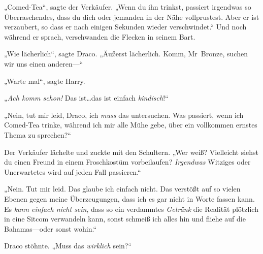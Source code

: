 „Comed-Tea“, sagte der Verkäufer. „Wenn du ihn trinkst, passiert irgendwas so Überraschendes, dass du dich oder jemanden in der Nähe vollprustest. Aber er ist verzaubert, so dass er nach einigen Sekunden wieder verschwindet.“ Und noch während er sprach, verschwanden die Flecken in seinem Bart.

„Wie lächerlich“, sagte Draco. „Äußerst lächerlich. Komm, Mr~Bronze, suchen wir uns einen anderen—“

„Warte mal“, sagte Harry.

„\emph{Ach komm schon!} Das ist…das ist einfach \emph{kindisch}!“

„Nein, tut mir leid, Draco, ich \emph{muss} das untersuchen. Was passiert, wenn ich Comed-Tea trinke, während ich mir alle Mühe gebe, über ein vollkommen ernstes Thema zu sprechen?“

Der Verkäufer lächelte und zuckte mit den Schultern. „Wer weiß? Vielleicht siehst du einen Freund in einem Froschkostüm vorbeilaufen? \emph{Irgendwas} Witziges oder Unerwartetes wird auf jeden Fall passieren.“

„Nein. Tut mir leid. Das glaube ich einfach nicht. Das verstößt auf so vielen Ebenen gegen meine Überzeugungen, dass ich es gar nicht in Worte fassen kann. Es \emph{kann einfach nicht sein}, dass so ein verdammtes \emph{Getränk} die Realität plötzlich in eine Sitcom verwandeln kann, sonst schmeiß ich alles hin und fliehe auf die Bahamas—oder sonst wohin.“

Draco stöhnte. „Muss das \emph{wirklich} sein?“

